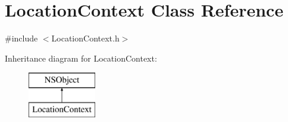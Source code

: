 \hypertarget{interface_location_context}{
\section{\-Location\-Context \-Class \-Reference}
\label{interface_location_context}
}


{\ttfamily \#include $<$\-Location\-Context.\-h$>$}

\-Inheritance diagram for \-Location\-Context\-:\begin{figure}[H]
\begin{center}
\leavevmode
\includegraphics[height=2.000000cm]{interface_location_context}
\end{center}
\end{figure}
